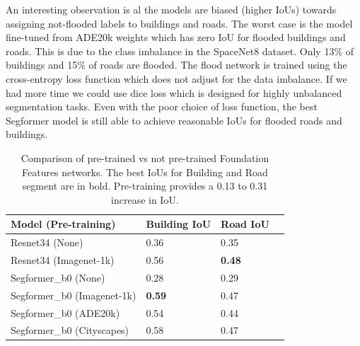 \documentclass[10pt,twocolumn,letterpaper]{article}
\begin{document}
An interesting observation is al the models are biased (higher IoUs) towards assigning not-flooded labels to buildings and roads. The worst case is the model fine-tuned from ADE20k weights which has zero IoU for flooded buildings and roads. This is due to the class imbalance in the SpaceNet8 dataset. Only 13\% of buildings and 15\% of roads are flooded. The flood network is trained using the cross-entropy loss function which does not adjust for the data imbalance. If we had more time we could use dice loss which is designed for highly unbalanced segmentation tasks. Even with the poor choice of loss function, the best Segformer model is still able to achieve reasonable IoUs for flooded roads and buildings.

\begin{table}
    \begin{tabular}{llll}
        Model (Pre-training) & Building IoU & Road IoU \\
        \hline
        Resnet34 (None) & 0.36 & 0.35 \\
        Resnet34 (Imagenet-1k) & 0.56 & \textbf{0.48} \\
        Segformer\_b0 (None) & 0.28 & 0.29 \\
        Segformer\_b0 (Imagenet-1k) & \textbf{0.59} & 0.47 \\
        Segformer\_b0 (ADE20k) & 0.54 & 0.44 \\
        Segformer\_b0 (Cityscapes) & 0.58 & 0.47 \\
    \end{tabular}
    \caption{Comparison of pre-trained vs not pre-trained Foundation Features networks. The best IoUs for Building and Road segment are in bold. Pre-training provides a 0.13 to 0.31 increase in IoU.}
    \label{fig:pre-training-foundation}
\end{table}
\end{document}
